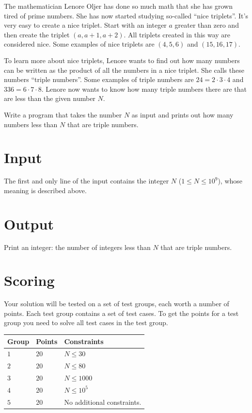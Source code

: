 \noindent

The mathematician Lenore Oljer has done so much math that she has grown tired of prime numbers.
She has now started studying so-called ``nice triplets''. It's very easy to create a nice
triplet. Start with an integer $a$ greater than zero and then create the triplet
$(a, a+1, a+2)$. All triplets created in this way are considered nice. Some examples of
nice triplets are $(4,5,6)$ and $(15,16,17)$.

To learn more about nice triplets, Lenore wants to find out how many numbers can be
written as the product of all the numbers in a nice triplet. She calls these numbers
``triple numbers''. Some examples of triple numbers are $24=2 \cdot 3 \cdot 4$
and $336 = 6 \cdot 7 \cdot 8$. Lenore now wants to know how many triple numbers
there are that are less than the given number $N$.

Write a program that takes the number $N$ as input and prints out how many numbers
less than $N$ that are triple numbers.

\section*{Input}
The first and only line of the input contains the integer $N$ ($1 \le N \le 10^9$),
whose meaning is described above.

\section*{Output}
Print an integer: the number of integers less than $N$ that are triple numbers. 

\section*{Scoring}
Your solution will be tested on a set of test groups, each worth a number of points. Each test group contains
a set of test cases. To get the points for a test group you need to solve all test cases in the test group.

\noindent
\begin{tabular}{| l | l | p{12cm} |}
  \hline
  \textbf{Group} & \textbf{Points} & \textbf{Constraints} \\ \hline
  $1$    & $20$       & $N \leq 30$ \\ \hline
  $2$    & $20$       & $N \leq 80$ \\ \hline
  $3$    & $20$       & $N \leq 1000$ \\ \hline
  $4$    & $20$       & $N \leq 10^5$ \\ \hline
  $5$    & $20$       & No additional constraints. \\ \hline
\end{tabular}
